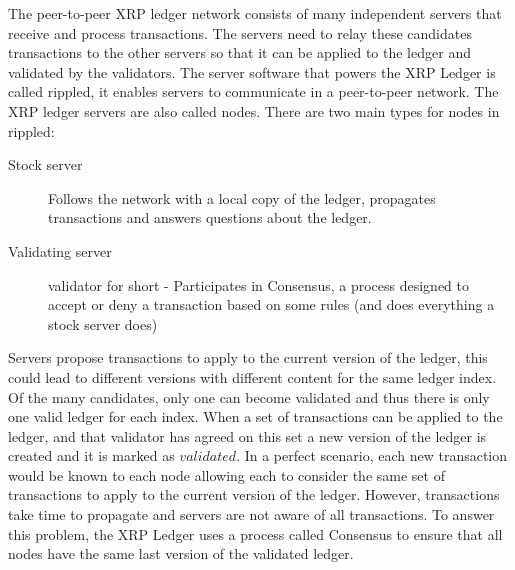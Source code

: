 The peer-to-peer XRP ledger network consists of many independent servers that receive and process transactions. The servers need to relay these candidates transactions to the other servers so that it can be applied to the ledger and validated by the validators. The server software that powers the XRP Ledger is called rippled\cite{rippled}, it enables servers to communicate in a peer-to-peer network.
The XRP ledger servers are also called nodes. There are two main types for nodes in rippled:
\begin{description}
\item[Stock server] Follows the network with a local copy of the ledger, propagates transactions and answers questions about the ledger.
\item[Validating server] validator for short - Participates in Consensus, a process designed to accept or deny a transaction based on some rules (and does everything a stock server does)
\end{description}
Servers propose transactions to apply to the current version of the ledger, this could lead to different versions with different content for the same ledger index. Of the many candidates, only one can become validated and thus there is only one valid ledger for each index. When a set of transactions can be applied to the ledger, and that validator has agreed on this set a new version of the ledger is created and it is marked as $validated$. In a perfect scenario, each new transaction would be known to each node allowing each to consider the same set of transactions to apply to the current version of the ledger. However, transactions take time to propagate and servers are not aware of all transactions. To answer this problem, the XRP Ledger uses a process called Consensus to ensure that all nodes have the same last version of the validated ledger.